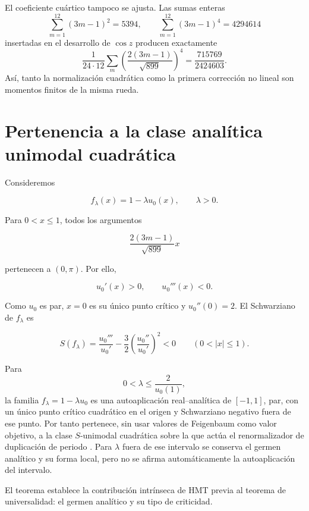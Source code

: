 El coeficiente cu\'artico tampoco se ajusta. Las sumas enteras
\begin{equation}
\sum_{m=1}^{12}(3m-1)^2=5394,\qquad
\sum_{m=1}^{12}(3m-1)^4=4294614
\label{mab:rm:eq:chaos-moments24}
\end{equation}
insertadas en el desarrollo de \(\cos z\) producen exactamente
\[
\frac1{24\cdot12}\sum_m
\left(\frac{2(3m-1)}{\sqrt{899}}\right)^4
=\frac{715769}{2424603}.
\]
As\'i, tanto la normalizaci\'on cuadr\'atica como la primera correcci\'on no
lineal son momentos finitos de la misma rueda.

\section{Pertenencia a la clase anal\'itica unimodal cuadr\'atica}

Consideremos

\[
f_\lambda(x)=1-\lambda u_0(x),\qquad \lambda>0.
\]

Para \(0<x\le1\), todos los argumentos

\[
\frac{2(3m-1)}{\sqrt{899}}x
\]

pertenecen a \((0,\pi)\). Por ello,

\[
u_0'(x)>0,\qquad u_0'''(x)<0.
\]

Como \(u_0\) es par, \(x=0\) es su único punto cr\'itico y \(u_0''(0)=2\). El Schwarziano de \(f_\lambda\) es

\begin{equation}
S(f_\lambda)
=\frac{u_0'''}{u_0'}
-\frac32\left(\frac{u_0''}{u_0'}\right)^2<0
\qquad(0<|x|\le1).
\label{mab:rm:eq:negative-schwarzian}
\end{equation}

\begin{theorem}
Para
\[
0<\lambda\le \frac{2}{u_0(1)},
\]
la familia \(f_\lambda=1-\lambda u_0\) es una autoaplicaci\'on real--anal\'itica de \([-1,1]\), par, con un único punto cr\'itico cuadr\'atico en el origen y Schwarziano negativo fuera de ese punto. Por tanto pertenece, sin usar valores de Feigenbaum como valor objetivo, a la clase \(S\)-unimodal cuadr\'atica sobre la que act\'ua el renormalizador de duplicaci\'on de periodo \cite{rm:Feigenbaum1978,rm:Lanford1982}. Para \(\lambda\) fuera de ese intervalo se conserva el germen anal\'itico y su forma local, pero no se afirma autom\'aticamente la autoaplicaci\'on del intervalo.
\end{theorem}

El teorema establece la contribuci\'on intr\'inseca de HMT previa al teorema
de universalidad: el germen anal\'itico y su tipo de criticidad.

